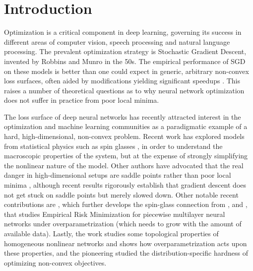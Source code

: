 \section{Introduction}
\label{sec:Intro}

%


Optimization is a critical component in deep learning, governing its success in different areas of computer vision, speech processing and natural language processing. The prevalent optimization strategy is Stochastic Gradient Descent, invented by Robbins and Munro in the 50s. The empirical performance of SGD on these models is better than one could expect in generic, arbitrary non-convex loss surfaces, often aided by modifications yielding significant speedups \cite{duchi2011adaptive, hinton2012lecture, ioffe2015batch, kingma2014adam}. This raises a number of theoretical questions as to why neural network optimization does not suffer in practice from poor local minima. 

The loss surface of deep neural networks has recently attracted interest 
in the optimization and machine learning communities as a paradigmatic example of 
a hard, high-dimensional, non-convex problem. 
Recent work has explored models from statistical physics such as spin glasses \cite{choromanska2015loss}, 
in order to understand the macroscopic properties of the system, but at the expense of strongly simplifying the nonlinear nature of the model. Other authors have advocated 
that the real danger in high-dimensional setups are saddle points 
rather than poor local minima \cite{dauphin2014identifying}, although 
recent results rigorously establish that gradient descent does not 
get stuck on saddle points \cite{lee2016gradient} but merely slowed down. 
Other notable recent contributions are \cite{followupmit}, which further develops the spin-glass 
connection from \cite{choromaska2015loss}, and \cite{soudry_columbia}, that studies Empirical Risk Minimization for piecewise multilayer neural networks under overparametrization (which needs to grow with the amount of available data). Lastly, the work \cite{shamir1} studies some topological 
properties of homogeneous nonlinear networks and shows how overparametrization acts upon these properties, and the pioneering \cite{shamir2} studied the distribution-specific hardness of optimizing non-convex objectives.


